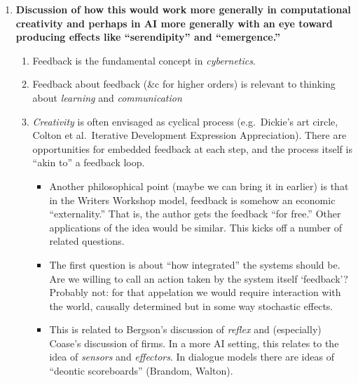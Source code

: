 \begin{enumerate}[start=4]
\item \textbf{Discussion of how this would work more generally in
  computational creativity and perhaps in AI more generally with an
  eye toward producing effects like ``serendipity'' and
  ``emergence.''}
\begin{enumerate}
\item Feedback is the fundamental concept in \emph{cybernetics}.  
\item Feedback about feedback (\&c for higher orders) is relevant to thinking about \emph{learning} and \emph{communication}
\item \emph{Creativity} is often envisaged as cyclical process (e.g.~Dickie's
  art circle, Colton et al.~Iterative
  Development Expression Appreciation).  There are opportunities for
  embedded feedback at each step, and the process itself is ``akin
  to'' a feedback loop.
\begin{itemize}
\item Another philosophical point (maybe we can bring it in earlier)
  is that in the Writers Workshop model, feedback is somehow an
  economic ``externality.''  That is, the author gets the feedback
  ``for free.''  Other applications of the idea would be similar.
  This kicks off a number of related questions.
\item The first question is about ``how integrated'' the systems
  should be.  Are we willing to call an action taken by the system
  itself `feedback'?  Probably not: for that appelation we would
  require interaction with the world, causally determined but in some
  way stochastic effects.
\item This is related to Bergson's discussion of \emph{reflex} and
  (especially) Coase's discussion of firms.  In a more AI setting,
  this relates to the idea of \emph{sensors} and \emph{effectors}.  In
  dialogue models there are ideas of ``deontic scoreboards''
  (Brandom, Walton).
\end{itemize}
\end{enumerate}
\end{enumerate}
